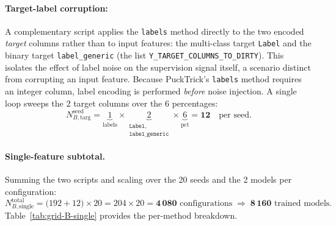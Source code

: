 \documentclass[../main.tex]{subfiles}
\begin{document}
\paragraph{Target-label corruption:}
A complementary script applies the \texttt{labels} method directly to the two encoded \emph{target} columns rather than to input features: the multi-class target \texttt{Label} and the binary target \texttt{label\_generic} (the list \texttt{Y\_TARGET\_COLUMNS\_TO\_DIRTY}).  This isolates the effect of label noise on the supervision signal itself, a scenario distinct from corrupting an input feature.  Because PuckTrick's \texttt{labels} method requires an integer column, label encoding is performed \emph{before} noise injection.  A single loop sweeps the $2$ target columns over the $6$ percentages:
\[
    N_{B,\text{targ}}^{\text{seed}}
    = \underbrace{1}_{\text{labels}} \times \underbrace{2}_{\substack{\texttt{Label},\\\texttt{label\_generic}}} \times \underbrace{6}_{\text{pct}}
    = \mathbf{12} \quad\text{per seed.}
\]

\paragraph{Single-feature subtotal.}
Summing the two scripts and scaling over the 20 seeds and the 2 models per configuration:
\[
    N_{B,\text{single}}^{\text{total}} = \bigl(192 + 12\bigr) \times 20 = 204 \times 20 = \mathbf{4\,080} \text{ configurations}
    \;\Longrightarrow\; \mathbf{8\,160} \text{ trained models}.
\]
Table~\ref{tab:grid-B-single} provides the per-method breakdown.
\end{document}
